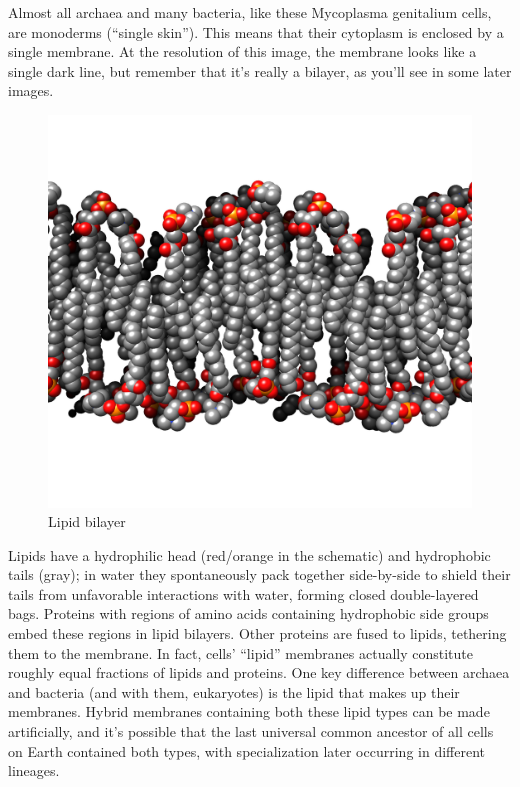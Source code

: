 \documentclass[]{tufte-book}
\begin{document}
Almost all archaea and many bacteria, like these Mycoplasma genitalium cells, are monoderms (``single skin''). This means that their cytoplasm is enclosed by a single membrane. At the resolution of this image, the membrane looks like a single dark line, but remember that it's really a bilayer, as you'll see in some later images.

\hypertarget{htmlwidget-cb580e70ebc04a04937a}{}

\begin{figure}
\includegraphics{img/02_schematic/2_1_1_LipidBilayer} \caption[Lipid bilayer]{Lipid bilayer}\label{fig:2-1-1}
\end{figure}

Lipids have a hydrophilic head (red/orange in the schematic) and hydrophobic tails (gray); in water they spontaneously pack together side-by-side to shield their tails from unfavorable interactions with water, forming closed double-layered bags. Proteins with regions of amino acids containing hydrophobic side groups embed these regions in lipid bilayers. Other proteins are fused to lipids, tethering them to the membrane. In fact, cells' ``lipid'' membranes actually constitute roughly equal fractions of lipids and proteins. One key difference between archaea and bacteria (and with them, eukaryotes) is the lipid that makes up their membranes. Hybrid membranes containing both these lipid types can be made artificially, and it's possible that the last universal common ancestor of all cells on Earth contained both types, with specialization later occurring in different lineages.
\end{document}
